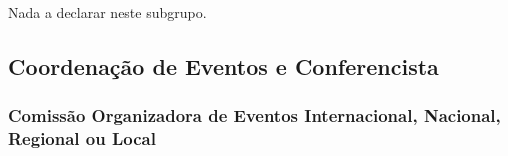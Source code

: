 \documentclass[a4paper,oneside,10pt]{article}
\begin{document}
Nada a declarar neste subgrupo.

\subsection{Coordenação de Eventos e Conferencista}
\vspace{0.3cm}


\subsubsection{Comiss\~{a}o Organizadora de Eventos Internacional, Nacional, Regional ou Local}
\vspace{0.3cm}
\end{document}
